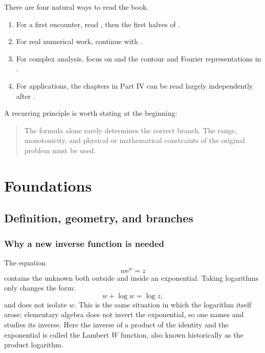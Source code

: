 \documentclass[11pt,openany]{book}
\newcommand{\e}{\mathrm{e}}
\theoremstyle{plain}
\theoremstyle{definition}
\theoremstyle{remark}
\begin{document}
There are four natural ways to read the book.
\begin{enumerate}[label=\arabic*.]
\item For a first encounter, read ,
then the first halves of .
\item For real numerical work, continue with
.
\item For complex analysis, focus on 
and the contour and Fourier representations in .
\item For applications, the chapters in Part IV can be read largely
independently after .
\end{enumerate}

A recurring principle is worth stating at the beginning:
\begin{quote}
The formula alone rarely determines the correct branch.  The range, monotonicity,
and physical or mathematical constraints of the original problem must be used.
\end{quote}

\tableofcontents
\listoffigures
\listoftables

\mainmatter

\part{Foundations}

\chapter{Definition, geometry, and branches}\label{chap:def}

\section{Why a new inverse function is needed}
The equation
\[
    w\e^w=z
\]
contains the unknown both outside and inside an exponential.  Taking logarithms
only changes the form:
\[
    w+\log w=\log z,
\]
and does not isolate \(w\).  This is the same situation in which the logarithm
itself arose: elementary algebra does not invert the exponential, so one names
and studies its inverse.  Here the inverse of a product of the identity and the
exponential is called the Lambert \(W\) function, also known historically as the
product logarithm.
\end{document}

